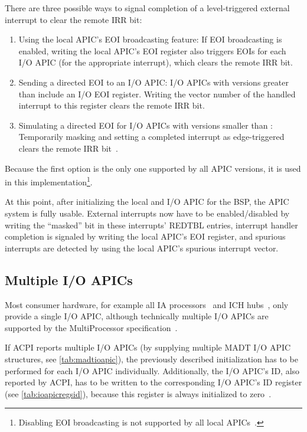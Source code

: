 There are three possible ways to signal completion of a level-triggered external interrupt to clear
the remote IRR bit:

\begin{enumerate}
  \item Using the local APIC's EOI broadcasting feature: If EOI broadcasting is enabled, writing the local
        APIC's EOI register also triggers EOIs for each I/O APIC (for the appropriate interrupt), which
        clears the remote IRR bit.
  \item Sending a directed EOI to an I/O APIC: I/O APICs with versions greater than  include an
        I/O EOI register. Writing the vector number of the handled interrupt to this register clears the
        remote IRR bit.
  \item Simulating a directed EOI for I/O APICs with versions smaller than : Temporarily masking
        and setting a completed interrupt as edge-triggered clears the remote IRR
        bit~\cite[io\textunderscore{}apic.c]{linux}.
\end{enumerate}

Because the first option is the only one supported by all APIC versions, it is used in this
implementation\footnote{Disabling EOI broadcasting is not supported by all local
  APICs~\cite[sec.~3.11.8.5]{ia32}.}.

At this point, after initializing the local and I/O APIC for the BSP, the APIC system is fully
usable. External interrupts now have to be enabled/disabled by writing the ``masked'' bit in these
interrupts' REDTBL entries, interrupt handler completion is signaled by writing the local APIC's
EOI register, and spurious interrupts are detected by using the local APIC's spurious interrupt
vector.

\subsection{Multiple I/O APICs}
\label{subsec:multiioapic}

Most consumer hardware, for example all IA processors~\cite{ia32} and ICH hubs~\cite{ich5}, only
provide a single I/O APIC, although technically multiple I/O APICs are supported by the
MultiProcessor specification~\cite[sec.~3.6.8]{mpspec}.

If ACPI reports multiple I/O APICs (by supplying multiple MADT I/O APIC structures, see
\autoref{tab:madtioapic}), the previously described initialization has to be performed for each I/O
APIC individually. Additionally, the I/O APIC's ID, also reported by ACPI, has to be written to the
corresponding I/O APIC's ID register (see \autoref{tab:ioapicregsid}), because this register is
always initialized to zero~\cite[sec.~9.5.6]{ich5}.

